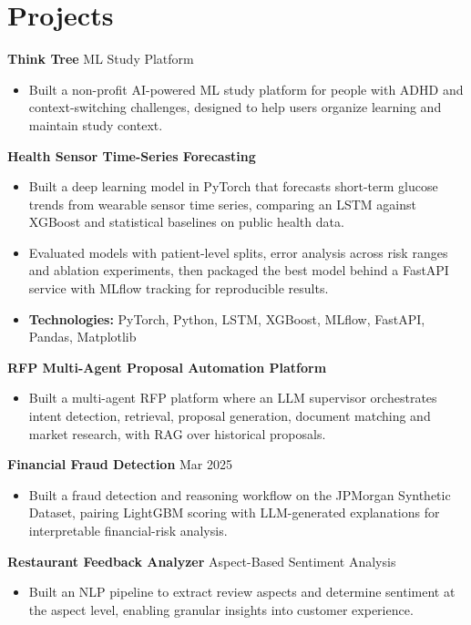 \documentclass[10pt,a4paper]{article}
\begin{document}
\section{Projects}
\textbf{Think Tree} \textbar{} ML Study Platform\par
\begin{itemize}
  \item Built a non-profit AI-powered ML study platform for people with ADHD and context-switching challenges, designed to help users organize learning and maintain study context.
\end{itemize}
\textbf{Health Sensor Time-Series Forecasting}\par
\begin{itemize}
  \item Built a deep learning model in PyTorch that forecasts short-term glucose trends from wearable sensor time series, comparing an LSTM against XGBoost and statistical baselines on public health data.
  \item Evaluated models with patient-level splits, error analysis across risk ranges and ablation experiments, then packaged the best model behind a FastAPI service with MLflow tracking for reproducible results.
  \item \textbf{Technologies:} PyTorch, Python, LSTM, XGBoost, MLflow, FastAPI, Pandas, Matplotlib
\end{itemize}
\textbf{RFP Multi-Agent Proposal Automation Platform}\par
\begin{itemize}
  \item Built a multi-agent RFP platform where an LLM supervisor orchestrates intent detection, retrieval, proposal generation, document matching and market research, with RAG over historical proposals.
\end{itemize}
\textbf{Financial Fraud Detection} \textbar{} Mar 2025\par
\begin{itemize}
  \item Built a fraud detection and reasoning workflow on the JPMorgan Synthetic Dataset, pairing LightGBM scoring with LLM-generated explanations for interpretable financial-risk analysis.
\end{itemize}
\textbf{Restaurant Feedback Analyzer} \textbar{} Aspect-Based Sentiment Analysis\par
\begin{itemize}
  \item Built an NLP pipeline to extract review aspects and determine sentiment at the aspect level, enabling granular insights into customer experience.
\end{itemize}
\end{document}
